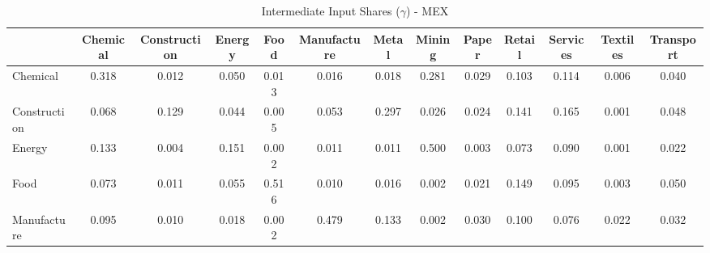 \begin{table}[htbp]
\centering
\caption{Intermediate Input Shares ($\gamma$) - MEX} 
\label{tab:gamma_MEX}
\begin{tabular}{lcccccccccccc}
  \hline
 & Chemical & Construction & Energy & Food & Manufacture & Metal & Mining & Paper & Retail & Services & Textiles & Transport \\ 
  \hline
Chemical & \textcolor[RGB]{14,9,241}{0.318} & \textcolor[RGB]{197,127,58}{0.012} & \textcolor[RGB]{119,77,136}{0.050} & \textcolor[RGB]{195,126,60}{0.013} & \textcolor[RGB]{188,121,67}{0.016} & \textcolor[RGB]{177,115,78}{0.018} & \textcolor[RGB]{23,15,232}{0.281} & \textcolor[RGB]{152,99,103}{0.029} & \textcolor[RGB]{62,40,193}{0.103} & \textcolor[RGB]{51,33,204}{0.114} & \textcolor[RGB]{216,140,39}{0.006} & \textcolor[RGB]{135,87,120}{0.040} \\ 
  Construction & \textcolor[RGB]{99,64,156}{0.068} & \textcolor[RGB]{48,31,207}{0.129} & \textcolor[RGB]{128,82,128}{0.044} & \textcolor[RGB]{218,141,37}{0.005} & \textcolor[RGB]{112,72,143}{0.053} & \textcolor[RGB]{18,11,237}{0.297} & \textcolor[RGB]{154,100,101}{0.026} & \textcolor[RGB]{159,103,96}{0.024} & \textcolor[RGB]{39,25,216}{0.141} & \textcolor[RGB]{27,17,228}{0.165} & \textcolor[RGB]{243,157,12}{0.001} & \textcolor[RGB]{124,80,131}{0.048} \\ 
  Energy & \textcolor[RGB]{46,30,209}{0.133} & \textcolor[RGB]{225,146,30}{0.004} & \textcolor[RGB]{30,19,225}{0.151} & \textcolor[RGB]{241,156,14}{0.002} & \textcolor[RGB]{200,129,55}{0.011} & \textcolor[RGB]{198,128,57}{0.011} & \textcolor[RGB]{4,2,251}{0.500} & \textcolor[RGB]{232,150,23}{0.003} & \textcolor[RGB]{89,57,166}{0.073} & \textcolor[RGB]{74,48,181}{0.090} & \textcolor[RGB]{246,159,9}{0.001} & \textcolor[RGB]{168,109,87}{0.022} \\ 
  Food & \textcolor[RGB]{90,58,165}{0.073} & \textcolor[RGB]{202,131,53}{0.011} & \textcolor[RGB]{108,70,147}{0.055} & \textcolor[RGB]{2,1,253}{0.516} & \textcolor[RGB]{209,135,46}{0.010} & \textcolor[RGB]{189,123,66}{0.016} & \textcolor[RGB]{234,151,21}{0.002} & \textcolor[RGB]{170,110,85}{0.021} & \textcolor[RGB]{32,21,223}{0.149} & \textcolor[RGB]{73,47,182}{0.095} & \textcolor[RGB]{230,149,25}{0.003} & \textcolor[RGB]{120,78,135}{0.050} \\ 
  Manufacture & \textcolor[RGB]{71,46,184}{0.095} & \textcolor[RGB]{205,133,50}{0.010} & \textcolor[RGB]{181,117,74}{0.018} & \textcolor[RGB]{239,155,16}{0.002} & \textcolor[RGB]{5,3,250}{0.479} & \textcolor[RGB]{42,27,212}{0.133} & \textcolor[RGB]{236,152,19}{0.002} & \textcolor[RGB]{151,97,104}{0.030} & \textcolor[RGB]{66,42,189}{0.100} & \textcolor[RGB]{85,55,170}{0.076} & \textcolor[RGB]{165,107,90}{0.022} & \textcolor[RGB]{149,96,106}{0.032} \\ 

\end{tabular}
\end{table}
